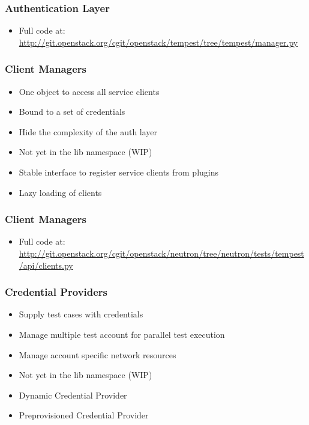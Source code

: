 \documentclass[aspectratio=169,11pt,hyperref={colorlinks=true}]{beamer}
\begin{document}
\begin{frame}
    \frametitle{Authentication Layer}
    
    \begin{itemize}
        \item \tiny Full code at: \href{http://git.openstack.org/cgit/openstack/tempest/tree/tempest/manager.py}{http://git.openstack.org/cgit/openstack/tempest/tree/tempest/manager.py}
    \end{itemize}
\end{frame}

\begin{frame}
    \frametitle{Client Managers}
    \begin{itemize}
        \item One object to access all service clients
        \item Bound to a set of credentials
        \item Hide the complexity of the auth layer
        \item Not yet in the lib namespace (WIP)
    \end{itemize}
    \begin{itemize}
        \item Stable interface to register service clients from plugins
        \item Lazy loading of clients
    \end{itemize}
\end{frame}

\begin{frame}
    \frametitle{Client Managers}
     
    \begin{itemize}
        \item \tiny Full code at: \href{http://git.openstack.org/cgit/openstack/neutron/tree/neutron/tests/tempest/api/clients.py}{http://git.openstack.org/cgit/openstack/neutron/tree/neutron/tests/tempest/api/clients.py}
    \end{itemize}
\end{frame}

\begin{frame}
    \frametitle{Credential Providers}
    \begin{itemize}
        \item Supply test cases with credentials
        \item Manage multiple test account for parallel test execution
        \item Manage account specific network resources
        \item Not yet in the lib namespace (WIP)
    \end{itemize}
    \begin{itemize}
        \item Dynamic Credential Provider
        \item Preprovisioned Credential Provider
    \end{itemize}
\end{frame}
\end{document}
